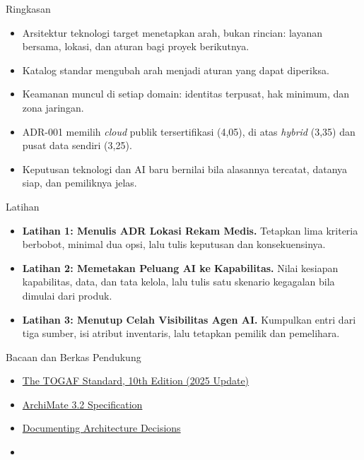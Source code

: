 \documentclass[aspectratio=169, table, 12pt]{beamer}
\begin{document}
\begin{frame}{{\Large Ringkasan}}
  \small
  \vspace{6pt}
  \begin{itemize}
    \item Arsitektur teknologi target menetapkan arah, bukan rincian: layanan bersama, lokasi, dan
          aturan bagi proyek berikutnya.
    \item Katalog standar mengubah arah menjadi aturan yang dapat diperiksa.
    \item Keamanan muncul di setiap domain: identitas terpusat, hak minimum, dan zona jaringan.
    \item ADR-001 memilih \textit{cloud} publik tersertifikasi (4,05), di atas \textit{hybrid} (3,35) dan
          pusat data sendiri (3,25).
    \item Keputusan teknologi dan AI baru bernilai bila alasannya tercatat, datanya siap, dan
          pemiliknya jelas.
  \end{itemize}
\end{frame}

\begin{frame}{{\Large Latihan}}
  \small
  \vspace{6pt}
  \begin{itemize}
    \item \textbf{Latihan 1: Menulis ADR Lokasi Rekam Medis.} Tetapkan lima kriteria berbobot, minimal
          dua opsi, lalu tulis keputusan dan konsekuensinya.
    \item \textbf{Latihan 2: Memetakan Peluang AI ke Kapabilitas.} Nilai kesiapan kapabilitas, data, dan
          tata kelola, lalu tulis satu skenario kegagalan bila dimulai dari produk.
    \item \textbf{Latihan 3: Menutup Celah Visibilitas Agen AI.} Kumpulkan entri dari tiga sumber, isi
          atribut inventaris, lalu tetapkan pemilik dan pemelihara.
  \end{itemize}
\end{frame}

\begin{frame}{{\Large Bacaan dan Berkas Pendukung}}
  \small
  \vspace{6pt}
  \begin{itemize}
    \item \href{https://www.opengroup.org/togaf}{The TOGAF Standard, 10th Edition (2025 Update)}
    \item \href{https://publications.opengroup.org/standards/archimate/c226}{ArchiMate 3.2 Specification}
    \item \href{https://cognitect.com/blog/2011/11/15/documenting-architecture-decisions}{Documenting Architecture Decisions}
    \item {}
  \end{itemize}
\end{frame}
\end{document}
